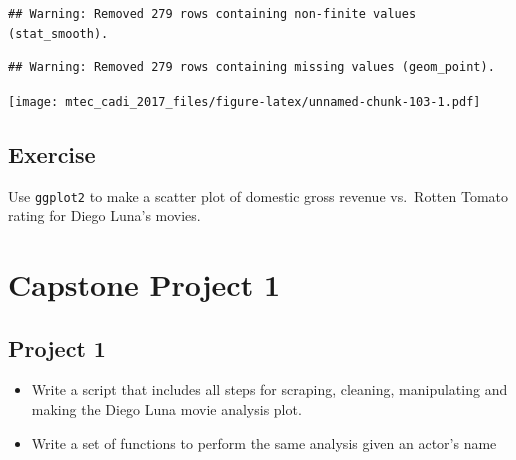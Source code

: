 \documentclass[]{book}
\newenvironment{Shaded}{\begin{snugshade}}{\end{snugshade}}
\newcommand{\KeywordTok}[1]{\textcolor[rgb]{0.13,0.29,0.53}{\textbf{#1}}}
\newcommand{\DataTypeTok}[1]{\textcolor[rgb]{0.13,0.29,0.53}{#1}}
\newcommand{\StringTok}[1]{\textcolor[rgb]{0.31,0.60,0.02}{#1}}
\newcommand{\OperatorTok}[1]{\textcolor[rgb]{0.81,0.36,0.00}{\textbf{#1}}}
\newcommand{\NormalTok}[1]{#1}
\theoremstyle{definition}
\theoremstyle{definition}
\theoremstyle{remark}
\begin{document}
\begin{Shaded}
\end{Shaded}

\begin{verbatim}
## Warning: Removed 279 rows containing non-finite values (stat_smooth).
\end{verbatim}

\begin{verbatim}
## Warning: Removed 279 rows containing missing values (geom_point).
\end{verbatim}

\texttt{[image: mtec\_cadi\_2017\_files/figure-latex/unnamed-chunk-103-1.pdf]}

\section{Exercise}\label{exercise-1}

Use \texttt{ggplot2} to make a scatter plot of domestic gross revenue
vs.~Rotten Tomato rating for Diego Luna's movies.

\chapter{Capstone Project 1}\label{capstone-project-1}

\section{Project 1}\label{project-1}

\begin{itemize}
\item
  Write a script that includes all steps for scraping, cleaning,
  manipulating and making the Diego Luna movie analysis plot.
\item
  Write a set of functions to perform the same analysis given an actor's
  name
\end{itemize}
\end{document}
